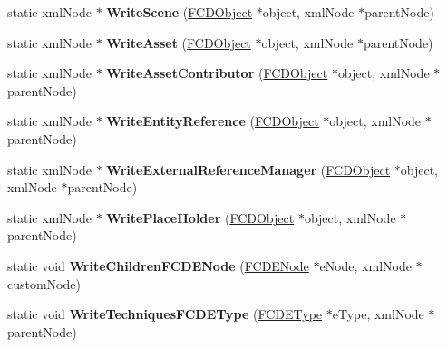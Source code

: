\begin{DoxyCompactItemize}
\item 
\hypertarget{classFArchiveXML_aa62412ae97a0a975224c39ee62842f4a}{
static xmlNode $\ast$ {\bfseries WriteScene} (\hyperlink{classFCDObject}{FCDObject} $\ast$object, xmlNode $\ast$parentNode)}
\label{classFArchiveXML_aa62412ae97a0a975224c39ee62842f4a}

\item 
\hypertarget{classFArchiveXML_a7929891047fb78e39ce44c0e5db43c86}{
static xmlNode $\ast$ {\bfseries WriteAsset} (\hyperlink{classFCDObject}{FCDObject} $\ast$object, xmlNode $\ast$parentNode)}
\label{classFArchiveXML_a7929891047fb78e39ce44c0e5db43c86}

\item 
\hypertarget{classFArchiveXML_a61bc3951cbfde500ae7d40a52c1d3d02}{
static xmlNode $\ast$ {\bfseries WriteAssetContributor} (\hyperlink{classFCDObject}{FCDObject} $\ast$object, xmlNode $\ast$parentNode)}
\label{classFArchiveXML_a61bc3951cbfde500ae7d40a52c1d3d02}

\item 
\hypertarget{classFArchiveXML_a9a408594db2809e2d7631cbc417f91bd}{
static xmlNode $\ast$ {\bfseries WriteEntityReference} (\hyperlink{classFCDObject}{FCDObject} $\ast$object, xmlNode $\ast$parentNode)}
\label{classFArchiveXML_a9a408594db2809e2d7631cbc417f91bd}

\item 
\hypertarget{classFArchiveXML_a70b9fb9c35eb9631e441c8669c57f752}{
static xmlNode $\ast$ {\bfseries WriteExternalReferenceManager} (\hyperlink{classFCDObject}{FCDObject} $\ast$object, xmlNode $\ast$parentNode)}
\label{classFArchiveXML_a70b9fb9c35eb9631e441c8669c57f752}

\item 
\hypertarget{classFArchiveXML_a6d3e5c3d99ba03c269e3e15fbb38402a}{
static xmlNode $\ast$ {\bfseries WritePlaceHolder} (\hyperlink{classFCDObject}{FCDObject} $\ast$object, xmlNode $\ast$parentNode)}
\label{classFArchiveXML_a6d3e5c3d99ba03c269e3e15fbb38402a}

\item 
\hypertarget{classFArchiveXML_a018809fda406851712e0231eb8930861}{
static void {\bfseries WriteChildrenFCDENode} (\hyperlink{classFCDENode}{FCDENode} $\ast$eNode, xmlNode $\ast$customNode)}
\label{classFArchiveXML_a018809fda406851712e0231eb8930861}

\item 
\hypertarget{classFArchiveXML_a1b99653a7a756124d2879cfd68521943}{
static void {\bfseries WriteTechniquesFCDEType} (\hyperlink{classFCDEType}{FCDEType} $\ast$eType, xmlNode $\ast$parentNode)}
\label{classFArchiveXML_a1b99653a7a756124d2879cfd68521943}


\end{DoxyCompactItemize}
